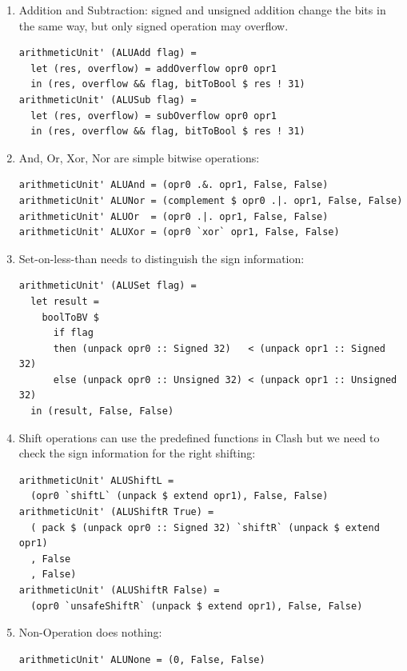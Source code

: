\documentclass[a4paper,12pt, oneside]{book}
\begin{document}
\begin{enumerate}
	\item Addition and Subtraction: signed and unsigned addition change the bits in the same way, but only signed operation may overflow. 
	\begin{verbatim}
arithmeticUnit' (ALUAdd flag) =
  let (res, overflow) = addOverflow opr0 opr1
  in (res, overflow && flag, bitToBool $ res ! 31)
arithmeticUnit' (ALUSub flag) =
  let (res, overflow) = subOverflow opr0 opr1
  in (res, overflow && flag, bitToBool $ res ! 31)
	\end{verbatim}
	\item And, Or, Xor, Nor are simple bitwise operations:
	\begin{verbatim}
arithmeticUnit' ALUAnd = (opr0 .&. opr1, False, False)
arithmeticUnit' ALUNor = (complement $ opr0 .|. opr1, False, False)
arithmeticUnit' ALUOr  = (opr0 .|. opr1, False, False)
arithmeticUnit' ALUXor = (opr0 `xor` opr1, False, False) 
	\end{verbatim}
	\item Set-on-less-than needs to distinguish the sign information:
	\begin{verbatim}
arithmeticUnit' (ALUSet flag) =
  let result =
    boolToBV $
      if flag
      then (unpack opr0 :: Signed 32)   < (unpack opr1 :: Signed 32)
      else (unpack opr0 :: Unsigned 32) < (unpack opr1 :: Unsigned 32)
  in (result, False, False)
\end{verbatim}
\item Shift operations can use the predefined functions in Clash but we need to check the sign information for the right shifting:
\begin{verbatim}
arithmeticUnit' ALUShiftL =
  (opr0 `shiftL` (unpack $ extend opr1), False, False)
arithmeticUnit' (ALUShiftR True) =
  ( pack $ (unpack opr0 :: Signed 32) `shiftR` (unpack $ extend opr1)
  , False
  , False)
arithmeticUnit' (ALUShiftR False) =
  (opr0 `unsafeShiftR` (unpack $ extend opr1), False, False)
\end{verbatim}
\item Non-Operation does nothing:
\begin{verbatim}
arithmeticUnit' ALUNone = (0, False, False)
\end{verbatim}
\end{enumerate}
\end{document}
